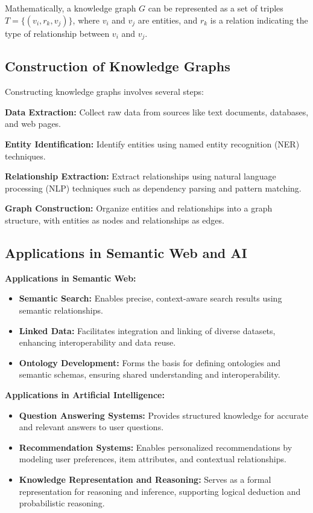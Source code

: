 \documentclass[12pt]{book} %
\begin{document}
Mathematically, a knowledge graph \(G\) can be represented as a set of triples \(T = \{(v_i, r_k, v_j)\}\), where \(v_i\) and \(v_j\) are entities, and \(r_k\) is a relation indicating the type of relationship between \(v_i\) and \(v_j\).

\subsection{Construction of Knowledge Graphs}

Constructing knowledge graphs involves several steps:

\textbf{Data Extraction:} Collect raw data from sources like text documents, databases, and web pages.

\textbf{Entity Identification:} Identify entities using named entity recognition (NER) techniques.

\textbf{Relationship Extraction:} Extract relationships using natural language processing (NLP) techniques such as dependency parsing and pattern matching.

\textbf{Graph Construction:} Organize entities and relationships into a graph structure, with entities as nodes and relationships as edges.

\subsection{Applications in Semantic Web and AI}

\textbf{Applications in Semantic Web:}
\begin{itemize}
    \item \textbf{Semantic Search:} Enables precise, context-aware search results using semantic relationships.
    \item \textbf{Linked Data:} Facilitates integration and linking of diverse datasets, enhancing interoperability and data reuse.
    \item \textbf{Ontology Development:} Forms the basis for defining ontologies and semantic schemas, ensuring shared understanding and interoperability.
\end{itemize}

\textbf{Applications in Artificial Intelligence:}
\begin{itemize}
    \item \textbf{Question Answering Systems:} Provides structured knowledge for accurate and relevant answers to user questions.
    \item \textbf{Recommendation Systems:} Enables personalized recommendations by modeling user preferences, item attributes, and contextual relationships.
    \item \textbf{Knowledge Representation and Reasoning:} Serves as a formal representation for reasoning and inference, supporting logical deduction and probabilistic reasoning.
\end{itemize}
\end{document}
